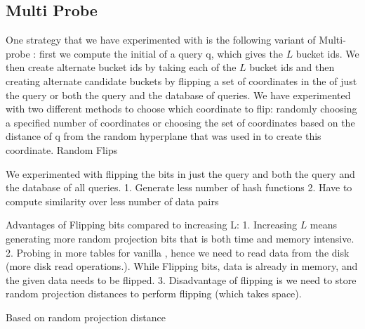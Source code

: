 \subsection{Multi Probe \lsh}

One strategy that we have experimented with is the following variant of Multi-probe \lsh:  first we compute the initial \lsh of a query q, which gives the $L$ bucket ids. We then create alternate bucket ids by taking each of the $L$ bucket ids and then creating alternate candidate buckets by flipping a set of coordinates in the \lsh of just the query or both the query and the database of queries. We have experimented with two different methods to choose which coordinate to flip: randomly choosing a specified number of coordinates or choosing the set of coordinates based on the distance of q from the random hyperplane that was used in to create this coordinate.  
{\rflip \lsh}
Random Flips

We experimented with flipping the bits in just the query and both the query and the database of all queries.  
1. Generate less number of hash functions
2. Have to compute similarity over less number of data pairs

Advantages of Flipping bits compared to increasing L:
1. Increasing $L$ means generating more random projection bits that is both time and memory intensive.   
2. Probing in more tables for vanilla \lsh, hence we need to read data from the disk (more disk read operations.). While Flipping bits, data is
already in memory, and the given data needs to be flipped.
3. Disadvantage of flipping is we need to store random projection distances to perform flipping (which takes space).


\dflip \lsh
Based on random projection distance 
